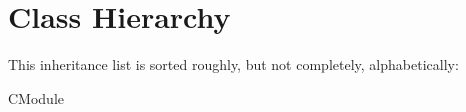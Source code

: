 \section{Class Hierarchy}
This inheritance list is sorted roughly, but not completely, alphabetically\+:\begin{DoxyCompactList}
\item C\+Module\begin{DoxyCompactList}
\item {}
\end{DoxyCompactList}
\item {}
\item {}
\end{DoxyCompactList}
